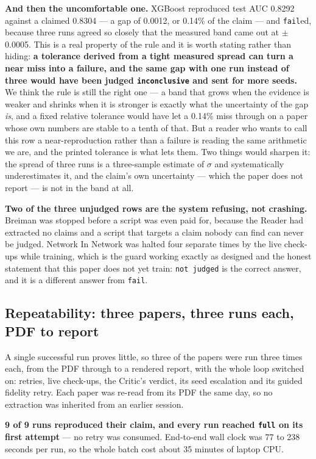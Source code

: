 \documentclass[11pt]{article}
\begin{document}
\textbf{And then the uncomfortable one.} XGBoost reproduced test AUC 0.8292 against a claimed
0.8304 --- a gap of 0.0012, or 0.14\% of the claim --- and \texttt{fail}ed, because three runs
agreed so closely that the measured band came out at $\pm$0.0005. This is a real property of the
rule and it is worth stating rather than hiding: \textbf{a tolerance derived from a tight
measured spread can turn a near miss into a failure, and the same gap with one run instead of
three would have been judged \texttt{inconclusive} and sent for more seeds.} We think the rule is
still the right one --- a band that grows when the evidence is weaker and shrinks when it is
stronger is exactly what the uncertainty of the gap \emph{is}, and a fixed relative tolerance
would have let a 0.14\% miss through on a paper whose own numbers are stable to a tenth of
that. But a reader who wants to call this row a near-reproduction rather than a failure is
reading the same arithmetic we are, and the printed tolerance is what lets them. Two things
would sharpen it: the spread of three runs is a three-sample estimate of $\sigma$ and
systematically underestimates it, and the claim's own uncertainty --- which the paper does not
report --- is not in the band at all.

\textbf{Two of the three unjudged rows are the system refusing, not crashing.} Breiman was
stopped before a script was even paid for, because the Reader had extracted no claims and a
script that targets a claim nobody can find can never be judged. Network In Network was halted
four separate times by the live check-ups while training, which is the guard working exactly as
designed and the honest statement that this paper does not yet train: \texttt{not judged} is the
correct answer, and it is a different answer from \texttt{fail}.

\subsection{Repeatability: three papers, three runs each, PDF to report}
\label{sec:repeat}

A single successful run proves little, so three of the papers were run three times each, from the
PDF through to a rendered report, with the whole loop switched on: retries, live check-ups, the
Critic's verdict, its seed escalation and its guided fidelity retry. Each paper was re-read from
its PDF the same day, so no extraction was inherited from an earlier session.

\textbf{9 of 9 runs reproduced their claim, and every run reached \texttt{full} on its first
attempt} --- no retry was consumed. End-to-end wall clock was 77 to 238 seconds per run, so the
whole batch cost about 35 minutes of laptop CPU.
\end{document}
